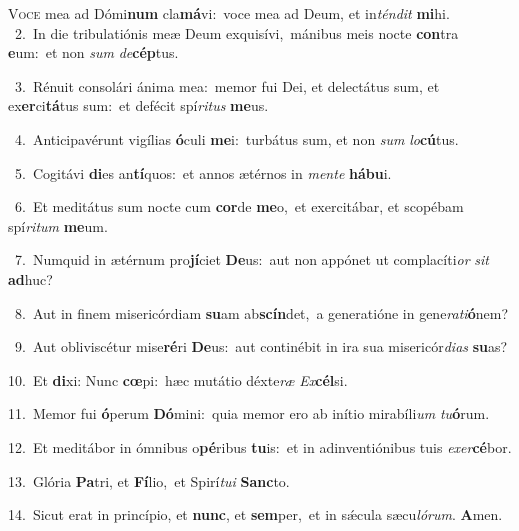 \lettrine{\initial\textcolor{\initialcolor}{V}}{oce} mea ad Dómi\textbf{num} cla\-\textbf{má}\-vi:~\star voce mea ad Deum, et in\-\textit{tén}\-\textit{dit} \textbf{mi}\-hi.\\
{\numbfont\textcolor{\numbcolor}{~2.}}~In die tribulatiónis meæ Deum exquisívi,~\dagger mánibus meis nocte \textbf{con}\-tra \textbf{e}\-um:~\star et non \textit{sum} \textit{de}\-\textbf{cép}tus.\par
{\numbfont\textcolor{\numbcolor}{~3.}}~Rénuit consolári ánima mea:~\dagger memor fui Dei, et delectátus sum, et ex\-\textbf{er}\-ci\-\textbf{tá}\-tus sum:~\star et defécit spí\-\textit{ri}\-\textit{tus} \textbf{me}\-us.\par
{\numbfont\textcolor{\numbcolor}{~4.}}~Anticipavérunt vigílias \textbf{ó}\-culi \textbf{me}\-i:~\star turbátus sum, et non \textit{sum} \textit{lo}\-\textbf{cú}tus.\par
{\numbfont\textcolor{\numbcolor}{~5.}}~Cogitávi \textbf{di}\-es an\-\textbf{tí}\-quos:~\star et annos ætérnos in \textit{men}\-\textit{te} \textbf{há}\-\textbf{bu}i.\par
{\numbfont\textcolor{\numbcolor}{~6.}}~Et meditátus sum nocte cum \textbf{cor}\-de \textbf{me}\-o,~\star et exercitábar, et scopébam spí\-\textit{ri}\-\textit{tum} \textbf{me}\-um.\par
{\numbfont\textcolor{\numbcolor}{~7.}}~Numquid in ætérnum pro\-\textbf{jí}\-ciet \textbf{De}\-us:~\star aut non appónet ut complacíti\textit{or} \textit{sit} \textbf{ad}\-huc?\par
{\numbfont\textcolor{\numbcolor}{~8.}}~Aut in finem misericórdiam \textbf{su}\-am ab\-\textbf{scín}\-det,~\star a generatióne in gene\-\textit{ra}\-\textit{ti}\textbf{ó}nem?\par
{\numbfont\textcolor{\numbcolor}{~9.}}~Aut obliviscétur mise\-\textbf{ré}\-ri \textbf{De}\-us:~\star aut continébit in ira sua misericór\-\textit{di}\-\textit{as} \textbf{su}\-as?\par
{\numbfont\textcolor{\numbcolor}{10.}}~Et \textbf{di}\-xi: Nunc \textbf{cœ}\-pi:~\star hæc mutátio déxte\textit{ræ} \textit{Ex}\-\textbf{cél}si.\par
{\numbfont\textcolor{\numbcolor}{11.}}~Memor fui \textbf{ó}\-perum \textbf{Dó}\-mini:~\star quia memor ero ab inítio mirabíli\textit{um} \textit{tu}\-\textbf{ó}rum.\par
{\numbfont\textcolor{\numbcolor}{12.}}~Et meditábor in ómnibus o\-\textbf{pé}\-ribus \textbf{tu}\-is:~\star et in adinventiónibus tuis \textit{ex}\-\textit{er}\textbf{cé}bor.\par
{\numbfont\textcolor{\numbcolor}{13.}}~Glória \textbf{Pa}\-tri, et \textbf{Fí}\-lio,~\star et Spirí\-\textit{tu}\-\textit{i} \textbf{Sanc}\-to.\par
{\numbfont\textcolor{\numbcolor}{14.}}~Sicut erat in princípio, et \textbf{nunc}\-, et \textbf{sem}\-per,~\star et in sǽcula sæcu\-\textit{ló}\-\textit{rum}. \textbf{A}\-men.\par
